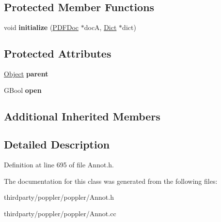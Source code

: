 \subsection*{Protected Member Functions}
\begin{DoxyCompactItemize}
\item 
\mbox{\label{class_annot_popup_af7bf4b19018dce6899a69caafa157527}} 
void {\bfseries initialize} (\hyperlink{class_p_d_f_doc}{P\+D\+F\+Doc} $\ast$docA, \hyperlink{class_dict}{Dict} $\ast$dict)
\end{DoxyCompactItemize}
\subsection*{Protected Attributes}
\begin{DoxyCompactItemize}
\item 
\mbox{\label{class_annot_popup_ac831531b380eafbf390768215c09a24e}} 
\hyperlink{class_object}{Object} {\bfseries parent}
\item 
\mbox{\label{class_annot_popup_af73578e69efa16cb80aebf5bdb8ca0da}} 
G\+Bool {\bfseries open}
\end{DoxyCompactItemize}
\subsection*{Additional Inherited Members}


\subsection{Detailed Description}


Definition at line 695 of file Annot.\+h.



The documentation for this class was generated from the following files\+:\begin{DoxyCompactItemize}
\item 
thirdparty/poppler/poppler/Annot.\+h\item 
thirdparty/poppler/poppler/Annot.\+cc\end{DoxyCompactItemize}
